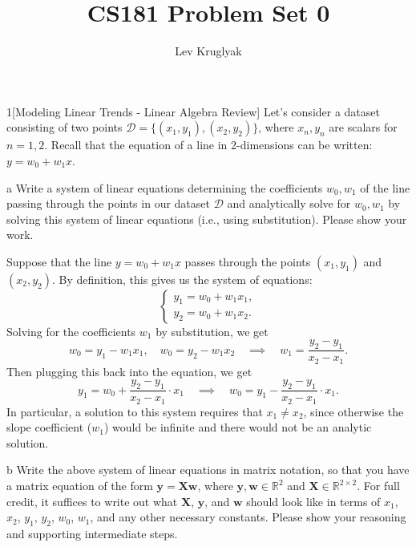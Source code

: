 \documentclass[expanded]{lkx_pset}
\title{CS181 Problem Set 0}
\author{Lev Kruglyak}
\begin{document}
\maketitle

\begin{problem}{1}[Modeling Linear Trends - Linear Algebra Review]
Let's consider a dataset consisting of two points $\mathcal{D} = \{(x_1, y_1), (x_2, y_2)\}$, where $x_n, y_n$ are scalars for $n=1, 2$. Recall that the equation of a line in 2-dimensions can be written: $y = w_0 + w_1x$. 
\end{problem}

\begin{parts}
  \begin{part}{a}
    Write a system of linear equations determining the coefficients $w_0, w_1$ of the line passing through the points in our dataset $\mathcal{D}$ and analytically solve for $w_0, w_1$ by solving this system of linear equations (i.e., using substitution). Please show your work.
  \end{part}

  Suppose that the line $y= w_0 + w_1x$ passes through the points $(x_1, y_1)$ and $(x_2, y_2)$. By definition, this gives us the system of equations:
  \[
    \begin{cases}
      y_1 = w_0 + w_1 x_1,\\ y_2 = w_0 + w_1 x_2.
    \end{cases}
  \]
  Solving for the coefficients $w_1$ by substitution, we get
  \[
    w_0 = y_1 - w_1x_1, \quad w_0 = y_2 - w_1 x_2 \quad\implies\quad w_1 = \frac{y_2 - y_1}{x_2 - x_1}.
  \]
  Then plugging this back into the equation, we get
  \[
    y_1 = w_0 + \frac{y_2-y_1}{x_2 - x_1}\cdot x_1 \quad\implies\quad w_0 = y_1 - \frac{y_2 - y_1}{x_2 - x_1}\cdot x_1.
  \]
  In particular, a solution to this system requires that $x_1\neq x_2$, since otherwise the slope coefficient ($w_1$) would be infinite and there would not be an analytic solution.

  \begin{part}{b}
    Write the above system of linear equations in matrix notation, so that you have a matrix equation of the form $\mathbf{y} = \mathbf{X}\mathbf{w}$, where $\mathbf{y}, \mathbf{w} \in \mathbb{R}^2$ and $\mathbf{X} \in \mathbb{R}^{2\times 2}$. 
    For full credit, it suffices to write out what $\mathbf{X}$, $\mathbf{y}$, and $\mathbf{w}$ should look like in terms of $x_1$, $x_2$, $y_1$, $y_2$, $w_0$, $w_1$, and any other necessary constants. Please show your reasoning and supporting intermediate steps.
  \end{part}


\end{parts}
\end{document}
